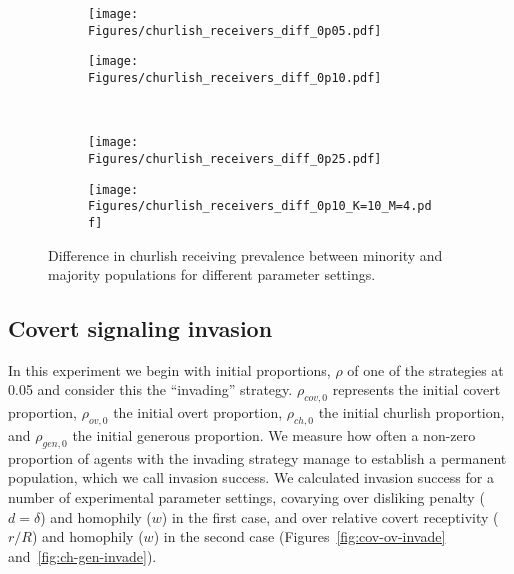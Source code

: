 \documentclass[11pt,letterpaper]{article}
\begin{document}
\begin{figure}[H]
  \centering
  \begin{subfigure}{0.48\textwidth}
    \centering
    \texttt{[image: Figures/churlish\_receivers\_diff\_0p05.pdf]}
  \end{subfigure}
  \hfill
  \begin{subfigure}{0.48\textwidth}
    \centering
    \texttt{[image: Figures/churlish\_receivers\_diff\_0p10.pdf]}
  \end{subfigure} \\[.25in]
  \begin{subfigure}{0.48\textwidth}
    \centering
    \texttt{[image: Figures/churlish\_receivers\_diff\_0p25.pdf]}
  \end{subfigure}
  \hfill
  \begin{subfigure}{0.48\textwidth}
    \centering
    \texttt{[image: Figures/churlish\_receivers\_diff\_0p10\_K=10\_M=4.pdf]}
  \end{subfigure}
  \caption{Difference in churlish receiving prevalence between minority and majority
  populations for different parameter settings.}
\end{figure}

\subsection{Covert signaling invasion}

In this experiment we begin with initial proportions, $\rho$ of one of the strategies
at 0.05 and consider this the ``invading'' strategy. $\rho_{cov,0}$ represents
the initial covert proportion, $\rho_{ov,0}$ the initial overt proportion,
$\rho_{ch,0}$ the initial churlish proportion, and $\rho_{gen,0}$ the 
initial generous proportion. We measure how often
a non-zero proportion of agents with the invading strategy manage to 
establish a permanent population, which we call invasion success. We calculated
invasion success for a number of experimental parameter settings, covarying
over disliking penalty ($d=\delta$) and homophily ($w$) in the first case,
and over relative covert receptivity ($r/R$) and homophily ($w$) 
in the second case (Figures~\ref{fig:cov-ov-invade} and~\ref{fig:ch-gen-invade}).
\end{document}
